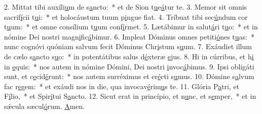 2. Mittat tibi auxíli\uline{u}m de s\uline{a}ncto:~* et de Sion t\uline{u}e\uline{á}tur te.
3. Memor sit omnis sacrif\uline{í}cii t\uline{u}i:~* et holocáustum tuum p\uline{i}ngue f\uline{i}at.
4. Tríbuat tibi sec\uline{ú}ndum cor t\uline{u}um:~* et omne consílium t\uline{u}um conf\uline{í}rmet.
5. Lætábimur in salut\uline{á}ri t\uline{u}o:~* et in nómine Dei nostri magn\uline{i}fic\uline{á}bimur.
6. Impleat Dóminus omnes petiti\uline{ó}nes t\uline{u}as:~* nunc cognóvi quóniam salvum fecit Dóminus Chr\uline{i}stum s\uline{u}um.
7. Exáudiet illum de cælo s\uline{a}ncto s\uline{u}o:~* in potentátibus salus d\uline{é}xteræ \uline{e}jus.
8. Hi in cúrribus, et h\uline{i} in \uline{e}quis:~* nos autem in nómine Dómini, Dei nostri \uline{i}nvoc\uline{á}bimus.
9. Ipsi obligáti sunt, et c\uline{e}cid\uline{é}runt:~* nos autem surréximus et er\uline{é}cti s\uline{u}mus.
10. Dómine s\uline{a}lvum fac r\uline{e}gem:~* et exáudi nos in die, qua invocav\uline{é}rim\uline{u}s te.
11. Glória P\uline{a}tri, et F\uline{í}lio,~* et Spir\uline{í}tui S\uline{a}ncto.
12. Sicut erat in princípio, et n\uline{u}nc, et s\uline{e}mper,~* et in sǽcula sæcul\uline{ó}rum. \uline{A}men.
